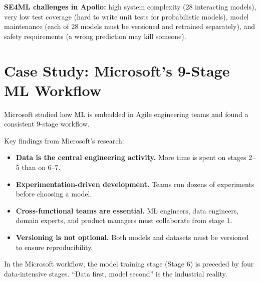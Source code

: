 \documentclass[a4paper,11pt]{article}
\begin{document}
\noindent\textbf{SE4ML challenges in Apollo:} high system complexity (28 interacting models), very low test coverage (hard to write unit tests for probabilistic models), model maintenance (each of 28 models must be versioned and retrained separately), and safety requirements (a wrong prediction may kill someone).

\section{Case Study: Microsoft's 9-Stage ML Workflow}

Microsoft studied how ML is embedded in Agile engineering teams and found a consistent 9-stage workflow.

\begin{center}
\end{center}

Key findings from Microsoft's research:
\begin{itemize}
  \item \textbf{Data is the central engineering activity.} More time is spent on stages 2--5 than on 6--7.
  \item \textbf{Experimentation-driven development.} Teams run dozens of experiments before choosing a model.
  \item \textbf{Cross-functional teams are essential.} ML engineers, data engineers, domain experts, and product managers must collaborate from stage 1.
  \item \textbf{Versioning is not optional.} Both models and datasets must be versioned to ensure reproducibility.
\end{itemize}

\begin{keytake}
In the Microsoft workflow, the model training stage (Stage 6) is preceded by four data-intensive stages. ``Data first, model second'' is the industrial reality.
\end{keytake}
\end{document}
